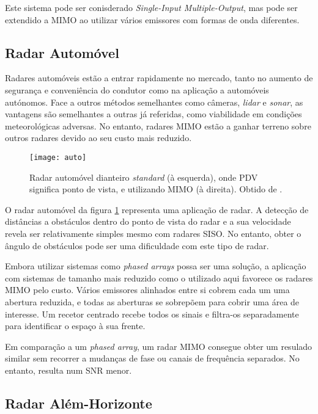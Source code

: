 \documentclass[purist,portuguese]{ist-report}
\begin{document}
Este sistema pode ser conisderado \textit{Single-Input Multiple-Output}, mas pode ser extendido a MIMO ao utilizar vários emissores com formas de onda diferentes.

\subsection{Radar Automóvel}

Radares automóveis estão a entrar rapidamente no mercado, tanto no aumento de segurança e conveniência do condutor como na aplicação a automóveis autónomos. Face a outros métodos semelhantes como câmeras, \textit{lidar} e \textit{sonar}, as vantagens são semelhantes a outras já referidas, como viabilidade em condições meteorológicas adversas. No entanto, radares MIMO estão a ganhar terreno sobre outros radares devido ao seu custo mais reduzido.

\begin{figure}[ht]
	\centering
	\texttt{[image: auto]}
	\caption{Radar automóvel dianteiro \textit{standard} (à esquerda), onde PDV significa ponto de vista, e utilizando MIMO (à direita). Obtido de \textit{\citeauthor{mimoradarbook}} \cite{mimoradarbook}.}
	\label{fig:autorad}
\end{figure}

O radar automóvel da figura \ref{fig:autorad} representa uma aplicação de radar. A detecção de distâncias a obstáculos dentro do ponto de vista do radar e a sua velocidade revela ser relativamente simples mesmo com radares SISO. No entanto, obter o ângulo de obstáculos pode ser uma dificuldade com este tipo de radar.

Embora utilizar sistemas como \textit{phased arrays} possa ser uma solução, a aplicação com sistemas de tamanho mais reduzido como o utilizado aqui favorece os radares MIMO pelo custo. Vários emissores alinhados entre si cobrem cada um uma abertura reduzida, e todas as aberturas se sobrepõem para cobrir uma área de interesse. Um recetor centrado recebe todos os sinais e filtra-os separadamente para identificar o espaço à sua frente.

Em comparação a um \textit{phased array}, um radar MIMO consegue obter um resulado similar sem recorrer a mudanças de fase ou canais de frequência separados. No entanto, resulta num SNR menor.

\subsection{Radar Além-Horizonte}
\end{document}
